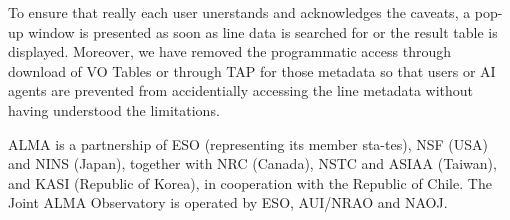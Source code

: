\documentclass[11pt,twoside]{article}
\begin{document}
To ensure that really each user unerstands and acknowledges the caveats, a pop-up window is presented as soon as line data is searched for or the result table is displayed. Moreover, we have removed the programmatic access through download of VO Tables or through TAP for those metadata so that users or AI agents are prevented from accidentially accessing the line metadata  without having understood the limitations.

\acknowledgements
ALMA is a partnership of ESO (representing its member sta-tes), NSF (USA) and NINS (Japan), together with NRC (Canada), NSTC and ASIAA (Taiwan), and KASI (Republic of Korea), in cooperation with the Republic of Chile. The Joint ALMA Observatory is operated by ESO, AUI/NRAO and NAOJ.





\end{document}
